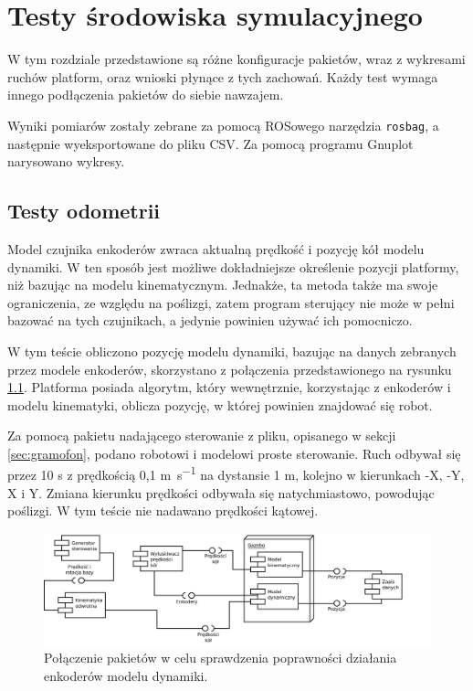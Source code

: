 \chapter{Testy środowiska symulacyjnego}
\label{sec:tests}
W tym rozdziale przedstawione są różne konfiguracje pakietów, wraz z wykresami ruchów platform, oraz wnioski płynące z tych zachowań.
Każdy test wymaga innego podłączenia pakietów do siebie nawzajem.

Wyniki pomiarów zostały zebrane za pomocą ROSowego narzędzia \texttt{rosbag}, a następnie wyeksportowane do pliku CSV. Za pomocą programu Gnuplot narysowano wykresy.

\section{Testy odometrii}
	\label{sec:test_odometry}
	Model czujnika enkoderów zwraca aktualną prędkość i pozycję kół modelu dynamiki.
	W ten sposób jest możliwe dokładniejsze określenie pozycji platformy, niż bazując na modelu kinematycznym.
	Jednakże, ta metoda także ma swoje ograniczenia, ze względu na poślizgi, zatem program sterujący nie może w pełni bazować na tych czujnikach, a jedynie powinien używać ich pomocniczo.
	
	W tym teście obliczono pozycję modelu dynamiki, bazując na danych zebranych przez modele enkoderów, skorzystano z połączenia przedstawionego na rysunku \ref{uml:encoders}.
	Platforma posiada algorytm, który wewnętrznie, korzystając z enkoderów i modelu kinematyki, oblicza pozycję, w której powinien znajdować się robot.
	
	Za pomocą pakietu nadającego sterowanie z pliku, opisanego w sekcji \ref{sec:gramofon}, podano robotowi i modelowi proste sterowanie.
	Ruch odbywał się przez 10 \si{\second} z prędkością 0,1 \si{\metre\per\second} na dystansie 1 \si{\metre}, kolejno w kierunkach -X, -Y, X i Y.
	Zmiana kierunku prędkości odbywała się natychmiastowo, powodując poślizgi.
	W tym teście nie nadawano prędkości kątowej.
	
	\begin{figure}[H]
		\centering
		\includegraphics[width=\textwidth]{uml/encoders.pdf}
			\caption{Połączenie pakietów w celu sprawdzenia poprawności działania enkoderów modelu dynamiki.}
		\label{uml:encoders}
	\end{figure}
	
